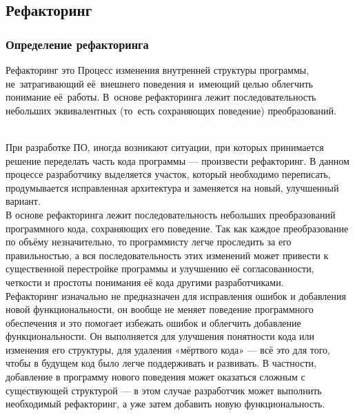 \documentclass{../industrial-development}
\begin{document}
\subsection{Рефакторинг}
\begin{frame} \frametitle{Определение рефакторинга}
	\begin{block}{Рефакторинг это}
		Процесс изменения внутренней структуры программы, не~затрагивающий её~внешнего поведения и~имеющий целью облегчить понимание её~работы. В~основе рефакторинга лежит последовательность небольших эквивалентных (то~есть сохраняющих поведение) преобразований. 
	\end{block}
\end{frame}
\lecturenotes
\\При разработке ПО, иногда возникают ситуации, при которых принимается решение переделать часть кода программы --- произвести рефакторинг. В данном процессе разработчику выделяется участок, который необходимо переписать, продумывается исправленная архитектура и заменяется на новый, улучшенный вариант.\\
В основе рефакторинга лежит последовательность небольших преобразований программного кода, сохраняющих его поведение. Так как каждое преобразование по объёму незначительно, то программисту легче проследить за его правильностью, а вся последовательность этих изменений может привести к существенной перестройке программы и улучшению её согласованности, четкости и простоты понимания её кода другими разработчиками.\\
Рефакторинг изначально не предназначен для исправления ошибок и добавления новой функциональности, он вообще не меняет поведение программного обеспечения и это помогает избежать ошибок и облегчить добавление функциональности. Он выполняется для улучшения понятности кода или изменения его структуры, для удаления «мёртвого кода» — всё это для того, чтобы в будущем код было легче поддерживать и развивать. В частности, добавление в программу нового поведения может оказаться сложным с существующей структурой — в этом случае разработчик может выполнить необходимый рефакторинг, а уже затем добавить новую функциональность.
\end{document}
